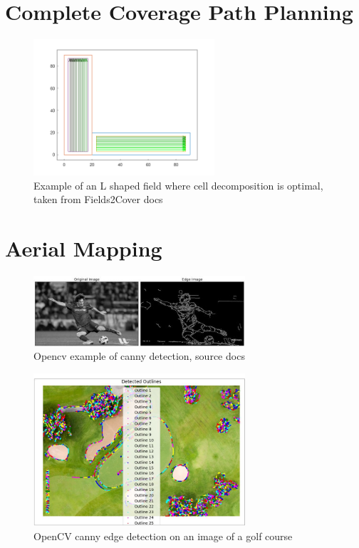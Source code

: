 \documentclass[final]{cmpreport_02}
\begin{document}
\clearpage
\section{Complete Coverage Path Planning}

\begin{figure}[h!]
	\centering
	\includegraphics[width=0.6\textwidth]{./images/f2cCellDecompL.png}
	\caption{Example of an L shaped field where cell decomposition is optimal, taken from Fields2Cover docs}
	\label{ccpp:cellDecomp}
\end{figure}

\section{Aerial Mapping}

\begin{figure}[h!]
	\centering
	\includegraphics[width=0.7\textwidth]{./images/openCvCannyExample.jpg}
	\caption{Opencv example of canny detection, source \citep{opencv_library} docs}
	\label{am:cannyexample}
\end{figure}


\begin{figure}[h!]
	\centering
	\includegraphics[width=0.7\textwidth]{./images/openCvCannyGolfCourse.png}
	\caption{OpenCV canny edge detection on an image of a golf course}
	\label{am:CannyGolfCourse}
\end{figure}
\end{document}
